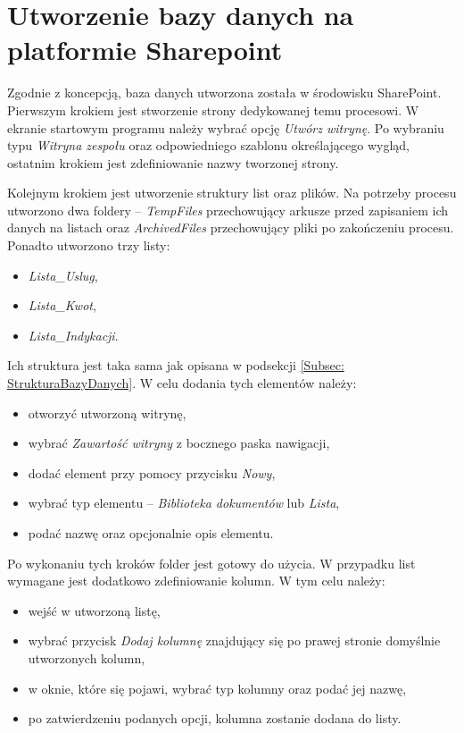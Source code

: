 \section{Utworzenie bazy danych na platformie Sharepoint}

Zgodnie z koncepcją, baza danych utworzona została w środowisku SharePoint.
Pierwszym krokiem jest stworzenie strony dedykowanej temu procesowi. W ekranie startowym programu należy wybrać opcję \emph{Utwórz witrynę}. Po wybraniu typu \emph{Witryna zespołu} oraz odpowiedniego szablonu określającego wygląd, ostatnim krokiem jest zdefiniowanie nazwy tworzonej strony.

Kolejnym krokiem jest utworzenie struktury list oraz plików. Na potrzeby procesu utworzono dwa foldery -- \emph{TempFiles} przechowujący arkusze przed zapisaniem ich danych na listach oraz \emph{ArchivedFiles} przechowujący pliki po zakończeniu procesu.
Ponadto utworzono trzy listy:
\begin{itemize}
    \item \emph{Lista\_Uslug},
    \item \emph{Lista\_Kwot},
    \item \emph{Lista\_Indykacji}.
\end{itemize}
\hfill \break
Ich struktura jest taka sama jak opisana w podsekcji \ref{Subsec: StrukturaBazyDanych}.
W celu dodania tych elementów należy:
\begin{itemize}
    \item otworzyć utworzoną witrynę,
    \item wybrać \emph{Zawartość witryny} z bocznego paska nawigacji,
    \item dodać element przy pomocy przycisku \emph{Nowy},
    \item wybrać typ elementu -- \emph{Biblioteka dokumentów} lub \emph{Lista},
    \item podać nazwę oraz opcjonalnie opis elementu.
\end{itemize}

Po wykonaniu tych kroków folder jest gotowy do użycia. W przypadku list wymagane jest dodatkowo zdefiniowanie kolumn. W tym celu należy:
\begin{itemize}
    \item wejść w utworzoną listę,
    \item wybrać przycisk \emph{Dodaj kolumnę} znajdujący się po prawej stronie domyślnie utworzonych kolumn,
    \item w oknie, które się pojawi, wybrać typ kolumny oraz podać jej nazwę,
    \item po zatwierdzeniu podanych opcji, kolumna zostanie dodana do listy.
\end{itemize}

